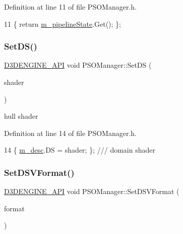 Definition at line 11 of file P\+S\+O\+Manager.\+h.


\begin{DoxyCode}
11 \{ \textcolor{keywordflow}{return} \mbox{\hyperlink{class_p_s_o_manager_aa34b6aa764012d33591474b456d1bfb7}{m\_pipelineState}}.Get(); \};
\end{DoxyCode}
\mbox{\label{class_p_s_o_manager_adafbbb5fa3b2fda0a51141c8d4afdd07}} 
\subsubsection{\texorpdfstring{Set\+D\+S()}{SetDS()}}
{\footnotesize\ttfamily \mbox{\hyperlink{stdafx_8h_a8ee2d990c5dfba7794dd2b60741d7722}{D3\+D\+E\+N\+G\+I\+N\+E\+\_\+\+A\+PI}} void P\+S\+O\+Manager\+::\+Set\+DS (\begin{DoxyParamCaption}\item[{const C\+D3\+D\+X12\+\_\+\+S\+H\+A\+D\+E\+R\+\_\+\+B\+Y\+T\+E\+C\+O\+DE}]{shader }\end{DoxyParamCaption})\hspace{0.3cm}{\ttfamily [inline]}}



hull shader 



Definition at line 14 of file P\+S\+O\+Manager.\+h.


\begin{DoxyCode}
14 \{ \mbox{\hyperlink{class_p_s_o_manager_ac5a7e346b2d641709d7146f5a0f45dee}{m\_desc}}.DS = shader; \}; \textcolor{comment}{/// domain shader}
\end{DoxyCode}
\mbox{\label{class_p_s_o_manager_ae0c03ebf488a4ec5097619a175cafc73}} 
\subsubsection{\texorpdfstring{Set\+D\+S\+V\+Format()}{SetDSVFormat()}}
{\footnotesize\ttfamily \mbox{\hyperlink{stdafx_8h_a8ee2d990c5dfba7794dd2b60741d7722}{D3\+D\+E\+N\+G\+I\+N\+E\+\_\+\+A\+PI}} void P\+S\+O\+Manager\+::\+Set\+D\+S\+V\+Format (\begin{DoxyParamCaption}\item[{const D\+X\+G\+I\+\_\+\+F\+O\+R\+M\+AT}]{format }\end{DoxyParamCaption})\hspace{0.3cm}{\ttfamily [inline]}}



